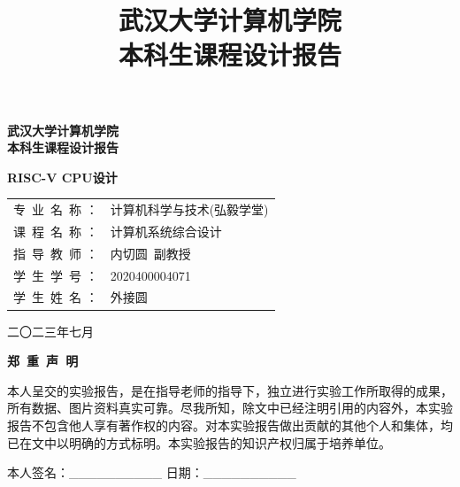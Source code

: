 \documentclass[UTF8,a4paper,autofakebold,15pt]{ctexart}
\title{武汉大学计算机学院\\
	本科生课程设计报告
}
\author{}
\date{}
\newcommand{\song}{\CJKfamily{song}}
\begin{document}
	
	\begin{center}
		
	\vspace{50pt}
	{\song{}\bfseries 武汉大学计算机学院\\\vspace{10pt}
		本科生课程设计报告}
	
	\vspace{50pt}
	
	{\heiti{}\bf RISC-V CPU设计}
	
	\vspace{100pt}
	
	\begin{spacing}{1.5}
	\qquad\begin{tabular}{ll}
		专\ 业\ 名\ 称   ：&计算机科学与技术(弘毅学堂)\\
		
		课\ 程\ 名\ 称   ：&计算机系统综合设计\\
		
		指\ 导\ 教\ 师   ：&内切圆\ 副教授\\
		
		学\ 生\ 学\ 号   ：&2020400004071\\
		
		学\ 生\ 姓\ 名   ：&外接圆
	\end{tabular}

	\end{spacing}

	\vspace{100pt}

	 二〇二三年七月
	
	\end{center}
	

\newpage

	\begin{center}

	{\song\bfseries 郑\ 重\ 声\ 明}
	\end{center}

	\vspace{40pt}
	
	本人呈交的实验报告，是在指导老师的指导下，独立进行实验工作所取得的成果，所有数据、图片资料真实可靠。尽我所知，除文中已经注明引用的内容外，本实验报告不包含他人享有著作权的内容。对本实验报告做出贡献的其他个人和集体，均已在文中以明确的方式标明。本实验报告的知识产权归属于培养单位。
	
	\vspace{40pt}
	
	本人签名：\_\_\_\_\_\_\_\_\_\_  \qquad\qquad\qquad        日期：\_\_\_\_\_\_\_\_\_\_
	
\end{document}
